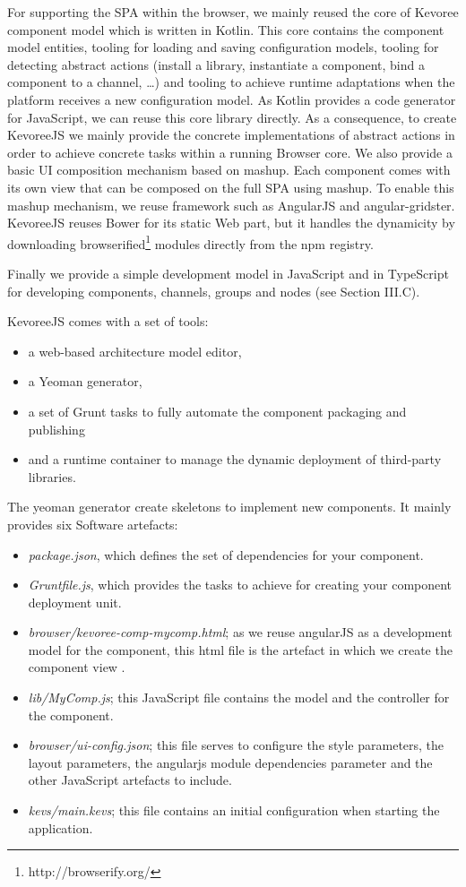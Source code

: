For supporting the SPA within the browser, we mainly reused the core of Kevoree component model which is written in Kotlin. This core contains the component model entities, tooling for loading and saving configuration models, tooling for detecting abstract actions (install a library, instantiate a component, bind a component to a channel, \dots)  and tooling to achieve runtime adaptations when the platform receives a new configuration model. As Kotlin provides a code generator for JavaScript, we can reuse this core library directly. As a consequence, to create KevoreeJS we mainly provide the concrete implementations of abstract actions in order to achieve concrete tasks within a running Browser core. We also provide a basic UI composition mechanism based on mashup. Each component comes with its own view that can be composed on the full SPA using mashup. To enable this mashup mechanism, we reuse framework such as AngularJS and angular-gridster. KevoreeJS reuses Bower for its static Web part, but it handles the dynamicity by downloading browserified\footnote{http://browserify.org/} modules directly from the npm registry.


Finally we provide a simple development model in JavaScript and in TypeScript for developing components, channels, groups and nodes (see Section III.C).

KevoreeJS comes with a set of tools: 

\begin{itemize}
	\item a web-based architecture model editor, 
	\item a Yeoman generator, 
	\item a set of Grunt tasks to fully automate the component packaging and publishing 
	\item and a runtime container to manage the dynamic deployment of third-party libraries.
\end{itemize}


The yeoman generator create skeletons to implement new components. It mainly provides six Software artefacts:
\begin{itemize}
	\item \emph{package.json}, which defines the set of dependencies for your component.
	\item \emph{Gruntfile.js}, which provides the tasks to achieve for creating your component deployment unit. 
	\item  \emph{browser/kevoree-comp-mycomp.html}; as we reuse angularJS as a development model for the component, this html file is the artefact in which we create the component  view .
	\item \emph{lib/MyComp.js}; this JavaScript file contains the model and the controller for the component.
	\item \emph{browser/ui-config.json}; this file serves to configure the style parameters, the layout parameters, the angularjs module dependencies parameter and the other JavaScript artefacts to include. 
	\item \emph{kevs/main.kevs}; this file contains an initial configuration when starting the application. 
\end{itemize}


